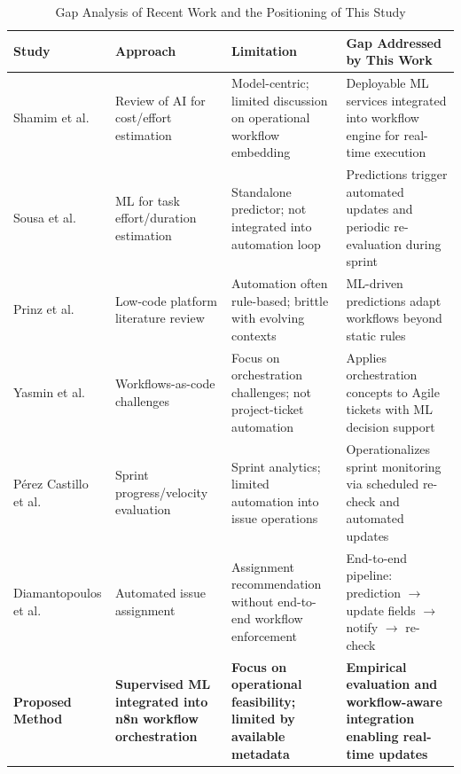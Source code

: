 \documentclass[conference]{IEEEtran}
\begin{document}
\begin{table}[t]
\caption{Gap Analysis of Recent Work and the Positioning of This Study}
\centering
\renewcommand{\arraystretch}{1.2}
\begin{tabular}{p{3.0cm} p{4.2cm} p{4.5cm} p{5.0cm}}
\hline
\textbf{Study} & \textbf{Approach} & \textbf{Limitation} & \textbf{Gap Addressed by This Work} \\
\hline
Shamim et al. \cite{shamim2025_costreview} &
Review of AI for cost/effort estimation &
Model-centric; limited discussion on operational workflow embedding &
Deployable ML services integrated into workflow engine for real-time execution \\
Sousa et al. \cite{sousa2023_task_effort} &
ML for task effort/duration estimation &
Standalone predictor; not integrated into automation loop &
Predictions trigger automated updates and periodic re-evaluation during sprint \\
Prinz et al. \cite{prinz2021_lowcode_slr} &
Low-code platform literature review &
Automation often rule-based; brittle with evolving contexts &
ML-driven predictions adapt workflows beyond static rules \\
Yasmin et al. \cite{yasmin2024_airflow_wac} &
Workflows-as-code challenges &
Focus on orchestration challenges; not project-ticket automation &
Applies orchestration concepts to Agile tickets with ML decision support \\
P\'erez Castillo et al. \cite{perezcastillo2024_sprint_velocity} &
Sprint progress/velocity evaluation &
Sprint analytics; limited automation into issue operations &
Operationalizes sprint monitoring via scheduled re-check and automated updates \\
Diamantopoulos et al. \cite{diamantopoulos2023_issue_assignment} &
Automated issue assignment &
Assignment recommendation without end-to-end workflow enforcement &
End-to-end pipeline: prediction $\rightarrow$ update fields $\rightarrow$ notify $\rightarrow$ re-check \\
\textbf{Proposed Method} &
\textbf{Supervised ML integrated into n8n workflow orchestration} &
\textbf{Focus on operational feasibility; limited by available metadata} &
\textbf{Empirical evaluation and workflow-aware integration enabling real-time updates} \\
\hline
\end{tabular}
\label{table:gap}
\end{table}

\end{document}
